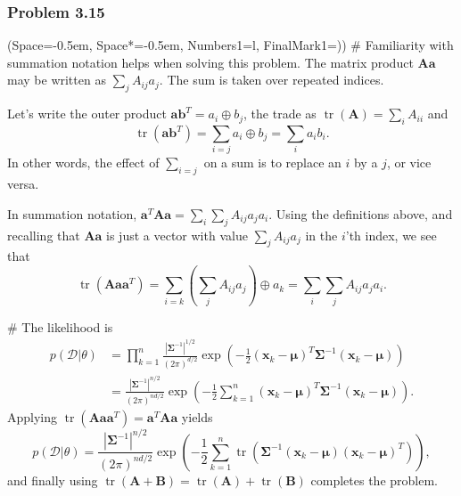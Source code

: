 \documentclass[12pt, a4paper]{article}
\newcommand{\listSpace}{-0.5em}%
\newcommand{\D}{\mathcal{D}}
\newcommand{\vect}[1]{\bm{#1}}
\newcommand{\abs}[1]{\left\lvert#1\right\rvert}
\begin{document}
\subsubsection*{Problem 3.15}
\begin{easylist}[enumerate]
\ListProperties(Space=\listSpace, Space*=\listSpace, Numbers1=l, FinalMark1={)})
# Familiarity with summation notation helps when solving this problem.
The matrix product $\vect{A}\vect{a}$ may be written as $\sum_j A_{ij} a_j$.
The sum is taken over repeated indices.

Let's write the outer product $\vect{a}\vect{b}^T = a_i \oplus b_j$, the trade as $\operatorname{tr}(\vect{A}) = \sum_i A_{ii}$ and
\begin{equation*}
	\operatorname{tr}(\vect{a}\vect{b}^T) = \sum_{i = j} a_i \oplus b_j = \sum_{i} a_i b_i.
\end{equation*}
In other words, the effect of $\sum_{i = j}$ on a sum is to replace an $i$ by a $j$, or vice versa.

In summation notation, $\vect{a}^T \vect{A} \vect{a} = \sum_i \sum_j A_{ij} a_j a_i$.
Using the definitions above, and recalling that $\vect{A} \vect{a}$ is just a vector with value $\sum_j A_{ij} a_j$ in the $i$'th index, we see that
\begin{equation*}
	\operatorname{tr}( \vect{A} \vect{a} \vect{a}^T) = \sum_{i=k}  \left( \sum_j A_{ij} a_j \right) \oplus a_k = \sum_i \sum_j A_{ij} a_j a_i.
\end{equation*}

# The likelihood is
\begin{align*}
	p(\D | \theta) &= \prod_{k=1}^{n} \frac{\abs{\vect{\Sigma}^{-1}}^{1/2}}{\left(2 \pi \right)^{d/2}} \exp \left( -\frac{1}{2} \left( \vect{x}_k - \vect{\mu} \right)^T  \vect{\Sigma}^{-1}  \left( \vect{x}_k - \vect{\mu} \right)\right) \\
	&=  \frac{\abs{\vect{\Sigma}^{-1}}^{n/2}}{\left(2 \pi \right)^{nd/2}} \exp \left( -\frac{1}{2}  \sum_{k=1}^{n} \left( \vect{x}_k - \vect{\mu} \right)^T  \vect{\Sigma}^{-1}  \left( \vect{x}_k - \vect{\mu} \right)\right).
\end{align*}
Applying $\operatorname{tr}( \vect{A} \vect{a} \vect{a}^T) = \vect{a}^T \vect{A} \vect{a}$ yields
\begin{equation*}
p(\D | \theta) = \frac{\abs{\vect{\Sigma}^{-1}}^{n/2}}{\left(2 \pi \right)^{nd/2}} \exp \left( -\frac{1}{2}  \sum_{k=1}^{n} 
\operatorname{tr} \left( \vect{\Sigma}^{-1} \left( \vect{x}_k - \vect{\mu} \right) \left( \vect{x}_k - \vect{\mu} \right)^T \right)
\right),
\end{equation*}
and finally using $\operatorname{tr}\left(\vect{A} + \vect{B}\right) = \operatorname{tr}\left(\vect{A}\right) + \operatorname{tr}\left( \vect{B}\right)$ completes the problem.


\end{easylist}
\end{document}
